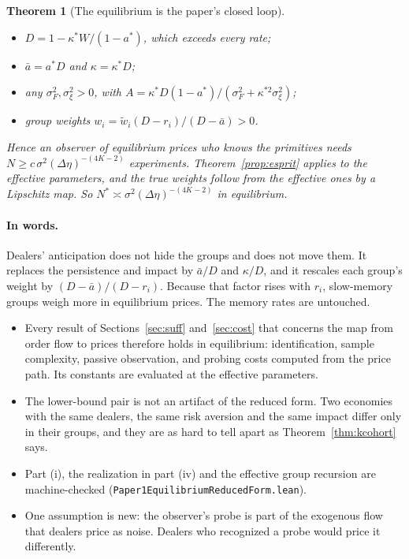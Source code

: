 \documentclass[12pt]{article}
\newtheorem{theorem}{Theorem}[section]
\theoremstyle{definition}
\theoremstyle{remark}
\begin{document}
\begin{theorem}[The equilibrium is the paper's closed loop]
\begin{enumerate}[label=(\roman*),itemsep=1pt]
 \begin{itemize}[itemsep=1pt,topsep=2pt]
 \item $D=1-\kappa^*W/(1-a^*)$, which exceeds every rate;
 \item $\bar a=a^*D$ and $\kappa=\kappa^*D$;
 \item any $\sigma_F^2,\sigma_\xi^2>0$, with $A=\kappa^*D(1-a^*)/(\sigma_F^2+\kappa^{*2}\sigma_\xi^2)$;
 \item group weights $w_i=\tilde w_i(D-r_i)/(D-\bar a)>0$.
 \end{itemize}
 Hence an observer of equilibrium prices who knows the primitives needs $N\ge c\,\sigma^2(\Delta\eta)^{-(4K-2)}$ experiments. Theorem~\ref{prop:esprit} applies to the effective parameters, and the true weights follow from the effective ones by a Lipschitz map. So $N^*\asymp\sigma^2(\Delta\eta)^{-(4K-2)}$ in equilibrium.
\end{enumerate}
\end{theorem}

\paragraph{In words.} Dealers' anticipation does not hide the groups and does not move them. It replaces the persistence and impact by $\bar a/D$ and $\kappa/D$, and it rescales each group's weight by $(D-\bar a)/(D-r_i)$. Because that factor rises with $r_i$, slow-memory groups weigh more in equilibrium prices. The memory rates are untouched.
\begin{itemize}[itemsep=1pt,topsep=2pt]
\item Every result of Sections~\ref{sec:suff} and~\ref{sec:cost} that concerns the map from order flow to prices therefore holds in equilibrium: identification, sample complexity, passive observation, and probing costs computed from the price path. Its constants are evaluated at the effective parameters.
\item The lower-bound pair is not an artifact of the reduced form. Two economies with the same dealers, the same risk aversion and the same impact differ only in their groups, and they are as hard to tell apart as Theorem~\ref{thm:kcohort} says.
\item Part (i), the realization in part (iv) and the effective group recursion are machine-checked (\nolinkurl{Paper1EquilibriumReducedForm.lean}).
\item One assumption is new: the observer's probe is part of the exogenous flow that dealers price as noise. Dealers who recognized a probe would price it differently.
\end{itemize}
\end{document}
